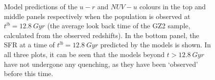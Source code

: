 \documentclass{mn2e}
\begin{document}
\begin{figure}
\caption{Model predictions of the $u-r$ and $NUV-u$ colours in the top and  middle panels respectively when the population is observed at $t^{lb} = 12.8~Gyr$ (the average look back time of the GZ2 sample, calculated from the observed redshifts). In the bottom panel, the SFR at a time of $t^{lb} = 12.8 ~Gyr$ predicted by the models is shown. In all three plots, it can be seen that the models beyond $t > 12.8~Gyr$ have not undergone any quenching, as they have been `observed' before this time.}
\label{pred}
\end{figure}
\end{document}
